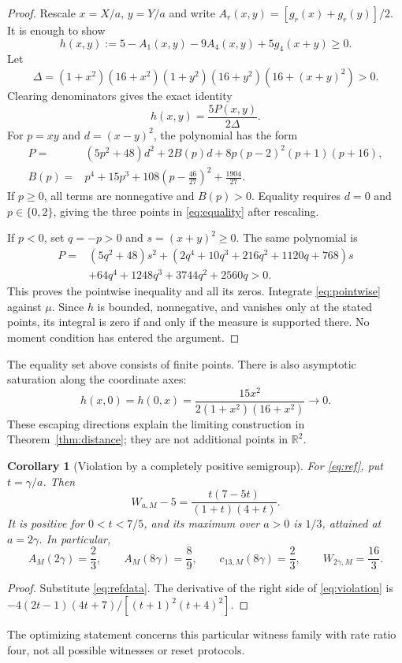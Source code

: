 \documentclass[11pt,a4paper]{article}
\newtheorem{corollary}[theorem]{Corollary}
\newcommand{\R}{\mathbb R}
\begin{document}
\begin{proof}
Rescale $x=X/a$, $y=Y/a$ and write
$A_r(x,y)=[g_r(x)+g_r(y)]/2$. It is enough to show
\begin{equation}\label{eq:pointwise}
 h(x,y):=5-A_1(x,y)-9A_4(x,y)+5g_4(x+y)\geq0.
\end{equation}
Let
\[
 \Delta=(1+x^2)(16+x^2)(1+y^2)(16+y^2)(16+(x+y)^2)>0.
\]
Clearing denominators gives the exact identity
\begin{equation}\label{eq:certificate}
 h(x,y)=\frac{5P(x,y)}{2\Delta}.
\end{equation}
For $p=xy$ and $d=(x-y)^2$, the polynomial has the form
\begin{align}\label{eq:positivecase}
 P={}&(5p^2+48)d^2+2B(p)d
       +8p(p-2)^2(p+1)(p+16),\\
 B(p)={}&p^4+15p^3+108\left(p-\frac{46}{27}\right)^2
                +\frac{1904}{27}.\nonumber
\end{align}
If $p\geq0$, all terms are nonnegative and $B(p)>0$.
Equality requires $d=0$ and $p\in\{0,2\}$, giving the three points
in \eqref{eq:equality} after rescaling.

If $p<0$, set $q=-p>0$ and $s=(x+y)^2\geq0$. The same polynomial is
\begin{align}\label{eq:negativecase}
 P={}&(5q^2+48)s^2
 +(2q^4+10q^3+216q^2+1120q+768)s\\
 &+64q^4+1248q^3+3744q^2+2560q>0.\nonumber
\end{align}
This proves the pointwise inequality and all its zeros. Integrate
\eqref{eq:pointwise} against $\mu$. Since $h$ is bounded,
nonnegative, and vanishes only at the stated points, its integral is
zero if and only if the measure is supported there. No moment
condition has entered the argument.
\end{proof}
The equality set above consists of finite points. There is also
asymptotic saturation along the coordinate axes:
\[
 h(x,0)=h(0,x)=\frac{15x^2}{2(1+x^2)(16+x^2)}\longrightarrow0.
\]
These escaping directions explain the limiting construction in
Theorem~\ref{thm:distance}; they are not additional points in $\R^2$.

\begin{corollary}[Violation by a completely positive semigroup]
For \eqref{eq:ref}, put $t=\gamma/a$. Then
\begin{equation}\label{eq:violation}
 W_{a,M}-5=\frac{t(7-5t)}{(1+t)(4+t)}.
\end{equation}
It is positive for $0<t<7/5$, and its maximum over $a>0$ is $1/3$,
attained at $a=2\gamma$. In particular,
\[
 A_M(2\gamma)=\frac23,\qquad A_M(8\gamma)=\frac89,
 \qquad c_{13,M}(8\gamma)=\frac23,
 \qquad W_{2\gamma,M}=\frac{16}{3}.
\]
\end{corollary}
\begin{proof}
Substitute \eqref{eq:refdata}. The derivative of the right side of
\eqref{eq:violation} is
$-4(2t-1)(4t+7)/[(t+1)^2(t+4)^2]$.
\end{proof}
The optimizing statement concerns this particular witness family with
rate ratio four, not all possible witnesses or reset protocols.
\end{document}
